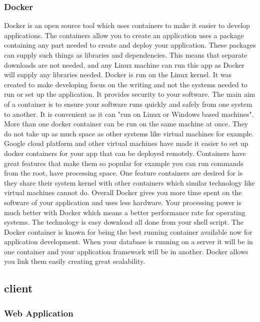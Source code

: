 \subsubsection{Docker}
Docker is an open source tool which uses containers to make it easier to develop applications.\cite{DockerCont} The containers allow you to create an application uses a package containing any part needed to create and deploy your application. These packages can supply such things as libraries and dependencies. This means that separate downloads are not needed, and any Linux machine can run this app as Docker will supply any libraries needed. Docker is run on the Linux kernel. It was created to make developing focus on the writing and not the systems needed to run or set up the application. It provides security to your software. The main aim of a container is to ensure your software runs quickly and safely from one system to another. It is convenient as it can "run on Linux or Windows based machines".\cite{Container} More than one docker container can be run on the same machine at once. They do not take up as much space as other systems like virtual machines for example. Google cloud platform and other virtual machines have made it easier to set up docker containers for your app that can be deployed remotely.\cite{DockerVsVm} Containers have great features that make them so popular for example you can run commands from the root, have processing space.\cite{DockerVsVm} One feature containers are desired for is they share their system kernel with other containers which similar technology like virtual machines cannot do. Overall Docker gives you more time spent on the software of your application and uses less hardware. Your processing power is much better with Docker which means a better performance rate for operating systems. The technology is easy download all done from your shell script. The Docker container is known for being the best running container available now for application development. When your database is running on a server it will be in one container and your application framework will be in another. Docker allows you link them easily creating great scalability. 

\subsection{client}
\subsubsection{Web Application}

